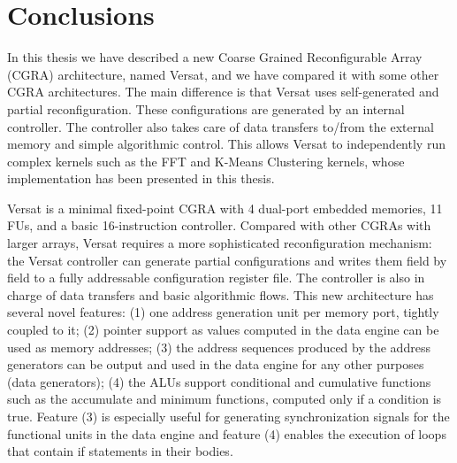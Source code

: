
\chapter{Conclusions}
\label{chapter:conclusions}

In this thesis we have described a new Coarse Grained Reconfigurable
Array (CGRA) architecture, named Versat, and we have compared it with
some other CGRA architectures. The main difference is that Versat uses
self-generated and partial reconfiguration. These configurations are
generated by an internal controller. The controller also takes care of
data transfers to/from the external memory and simple algorithmic
control. This allows Versat to independently run complex kernels such
as the FFT and K-Means Clustering kernels, whose implementation has
been presented in this thesis.

Versat is a minimal fixed-point CGRA with 4 dual-port embedded
memories, 11 FUs, and a basic 16-instruction controller. Compared with
other CGRAs with larger arrays, Versat requires a more sophisticated
reconfiguration mechanism: the Versat controller can generate partial
configurations and writes them field by field to a fully addressable
configuration register file. The controller is also in charge of data
transfers and basic algorithmic flows. This new architecture has
several novel features: (1) one address generation unit per memory
port, tightly coupled to it; (2) pointer support as values computed in
the data engine can be used as memory addresses; (3) the address
sequences produced by the address generators can be output and used in
the data engine for any other purposes (data generators); (4) the ALUs
support conditional and cumulative functions such as the accumulate
and minimum functions, computed only if a condition is true. Feature
(3) is especially useful for generating synchronization signals for
the functional units in the data engine and feature (4) enables the
execution of loops that contain if statements in their bodies.

